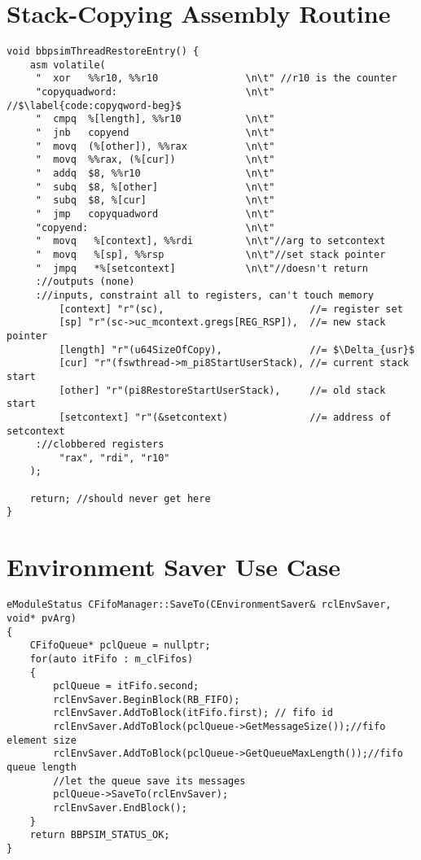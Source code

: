 {\chapter{Stack-Copying Assembly Routine}\label{code:stk-copy-asm}

\begin{verbatim}
void bbpsimThreadRestoreEntry() {
	asm volatile(
	 "  xor   %%r10, %%r10               \n\t" //r10 is the counter
	 "copyquadword:                      \n\t" //$\label{code:copyqword-beg}$
	 "  cmpq  %[length], %%r10           \n\t"
	 "  jnb   copyend                    \n\t"
	 "  movq  (%[other]), %%rax          \n\t"
	 "  movq  %%rax, (%[cur])            \n\t"
	 "  addq  $8, %%r10                  \n\t"
	 "  subq  $8, %[other]               \n\t"
	 "  subq  $8, %[cur]                 \n\t"
	 "  jmp   copyquadword               \n\t"
	 "copyend:                           \n\t"
	 "  movq   %[context], %%rdi         \n\t"//arg to setcontext
	 "  movq   %[sp], %%rsp              \n\t"//set stack pointer
	 "  jmpq   *%[setcontext]            \n\t"//doesn't return
	 ://outputs (none)
	 ://inputs, constraint all to registers, can't touch memory
	     [context] "r"(sc),                         //= register set
	     [sp] "r"(sc->uc_mcontext.gregs[REG_RSP]),  //= new stack pointer
	     [length] "r"(u64SizeOfCopy),               //= $\Delta_{usr}$
	     [cur] "r"(fswthread->m_pi8StartUserStack), //= current stack start
	     [other] "r"(pi8RestoreStartUserStack),     //= old stack start
	     [setcontext] "r"(&setcontext)              //= address of setcontext 
	 ://clobbered registers
	     "rax", "rdi", "r10"
	);
	
	return; //should never get here
}
\end{verbatim}

\chapter{Environment Saver Use Case}\label{code:env-saver-use}

\begin{verbatim}
eModuleStatus CFifoManager::SaveTo(CEnvironmentSaver& rclEnvSaver, void* pvArg)
{
	CFifoQueue* pclQueue = nullptr;
	for(auto itFifo : m_clFifos)
	{
		pclQueue = itFifo.second;
		rclEnvSaver.BeginBlock(RB_FIFO);
		rclEnvSaver.AddToBlock(itFifo.first); // fifo id
		rclEnvSaver.AddToBlock(pclQueue->GetMessageSize());//fifo element size
		rclEnvSaver.AddToBlock(pclQueue->GetQueueMaxLength());//fifo queue length
		//let the queue save its messages
		pclQueue->SaveTo(rclEnvSaver);
		rclEnvSaver.EndBlock();
	}
	return BBPSIM_STATUS_OK;
}
\end{verbatim}
}
